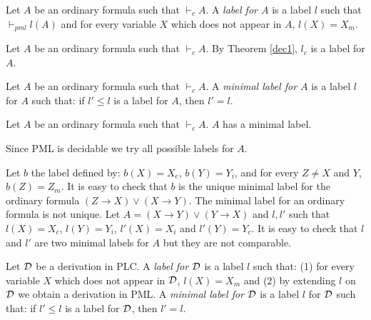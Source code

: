 \documentclass{jancl}
\begin{document}
\begin{definition}
Let $A$ be an ordinary formula such that ${\vdash}_c A$. A \emph{label
for $A$} is a label $l$ such that ${\vdash}_{pml} l(A)$ and for every
variable $X$ which does not appear in $A$, $l(X) = X_m$.
\end{definition}

\begin{remark}
Let $A$ be an ordinary formula such that ${\vdash}_c A$. By Theorem
\ref{dec1}, $l_c$ is a label for $A$.
\end{remark}

\begin{definition}
Let $A$ be an ordinary formula such that ${\vdash}_c A$.  A
\emph{minimal label for $A$} is a label $l$ for $A$ such that: if
$l' \leq l$ is a label for $A$, then $l' = l$.
\end{definition}

\begin{theorem} \label{decform}
Let $A$ be an ordinary formula such that ${\vdash}_c A$. $A$ has a
minimal label.
\end{theorem}

\begin{proof*}
Since PML is decidable we try all possible labels for
$A$.
\end{proof*}

\begin{example}\label{dece}
Let $b$ the label defined by: $b(X) = X_c$, $b(Y) = Y_i$, and
for every $Z \not = X$ and $Y$, $b(Z) = Z_m$. It is easy to check that
$b$ is the unique minimal label for the ordinary formula $(Z {\rightarrow}
X) {\vee} (X {\rightarrow} Y)$. The minimal label for an ordinary formula is not
unique.  Let $A = (X {\rightarrow} Y) {\vee} (Y {\rightarrow} X)$ and $l,l'$ such
that $l(X)=X_c$, $l(Y)=Y_i$, $l'(X)=X_i$ and $l'(Y)=Y_c$. It is easy
to check that $l$ and $l'$ are two minimal labels for $A$ but
they are not comparable.
\end{example}

\begin{definition}
Let ${\cal D}$ be a derivation in {\rm PLC}. A \emph{label for
${\cal D}$} is a label $l$ such that: (1) for every variable $X$
which does not appear in ${\cal D}$, $l(X) = X_m$ and (2) by
extending $l$ on ${\cal D}$ we obtain a derivation in {\rm PML}. A
\emph{minimal label for ${\cal D}$} is a label $l$ for ${\cal D}$
such that: if $l' \leq l$ is a label for ${\cal D}$, then $l' =
l$.
\end{definition}
\end{document}
